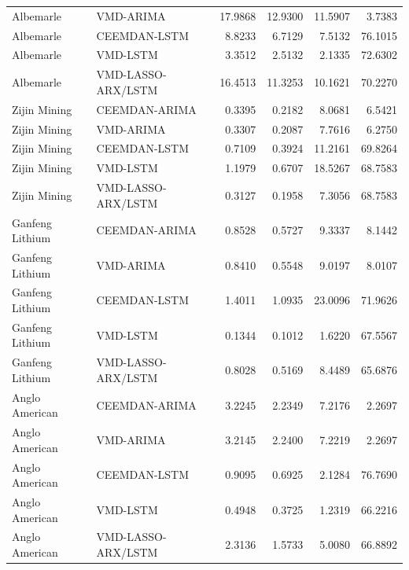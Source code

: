 \begin{longtable}{llrrrr}
Albemarle & VMD-ARIMA & 17.9868 & 12.9300 & 11.5907 & 3.7383 \\
Albemarle & CEEMDAN-LSTM & 8.8233 & 6.7129 & 7.5132 & 76.1015 \\
Albemarle & VMD-LSTM & 3.3512 & 2.5132 & 2.1335 & 72.6302 \\
Albemarle & VMD-LASSO-ARX/LSTM & 16.4513 & 11.3253 & 10.1621 & 70.2270 \\
Zijin Mining & CEEMDAN-ARIMA & 0.3395 & 0.2182 & 8.0681 & 6.5421 \\
Zijin Mining & VMD-ARIMA & 0.3307 & 0.2087 & 7.7616 & 6.2750 \\
Zijin Mining & CEEMDAN-LSTM & 0.7109 & 0.3924 & 11.2161 & 69.8264 \\
Zijin Mining & VMD-LSTM & 1.1979 & 0.6707 & 18.5267 & 68.7583 \\
Zijin Mining & VMD-LASSO-ARX/LSTM & 0.3127 & 0.1958 & 7.3056 & 68.7583 \\
Ganfeng Lithium & CEEMDAN-ARIMA & 0.8528 & 0.5727 & 9.3337 & 8.1442 \\
Ganfeng Lithium & VMD-ARIMA & 0.8410 & 0.5548 & 9.0197 & 8.0107 \\
Ganfeng Lithium & CEEMDAN-LSTM & 1.4011 & 1.0935 & 23.0096 & 71.9626 \\
Ganfeng Lithium & VMD-LSTM & 0.1344 & 0.1012 & 1.6220 & 67.5567 \\
Ganfeng Lithium & VMD-LASSO-ARX/LSTM & 0.8028 & 0.5169 & 8.4489 & 65.6876 \\
Anglo American & CEEMDAN-ARIMA & 3.2245 & 2.2349 & 7.2176 & 2.2697 \\
Anglo American & VMD-ARIMA & 3.2145 & 2.2400 & 7.2219 & 2.2697 \\
Anglo American & CEEMDAN-LSTM & 0.9095 & 0.6925 & 2.1284 & 76.7690 \\
Anglo American & VMD-LSTM & 0.4948 & 0.3725 & 1.2319 & 66.2216 \\
Anglo American & VMD-LASSO-ARX/LSTM & 2.3136 & 1.5733 & 5.0080 & 66.8892 \\
\end{longtable}
